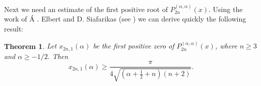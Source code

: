 \documentclass[12pt]{amsart}
\newtheorem{theorem}{Theorem}
\begin{document}
Next we need an estimate of the first positive root of $P_{2n}^{\left(
\alpha ,\alpha \right) }\left( x\right) .$ Using the work of \'{A}
. Elbert and D. Siafarikas (see \cite{ElSi99}) we can derive quickly the following result:


\begin{theorem} \label{Elbert}
Let $x_{2n,1}\left( \alpha \right) $ be the first positive zero of $
P_{2n}^{\left( \alpha ,\alpha \right) }\left( x\right) $, where $n\geq 3$ and $\alpha \geq -1/2.$ Then 
\begin{equation*}
x_{2n,1}\left( \alpha \right) \geq \frac{\pi }{4\sqrt{\left( \alpha +\frac{1
}{2}+n\right) \left( n+2\right) }}.
\end{equation*}

\end{theorem}
\end{document}
